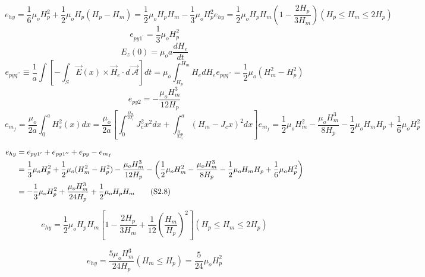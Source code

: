 \begin{equation}%
e_{hy}=\frac{1}{6}\mu_oH_{p}^{2}+\frac{1}{2}\mu_oH_p(H_p-H_m) 
=\frac{1}{2}\mu_oH_pH_m-\frac{1}{3}\mu_oH_{p}^{2}
e_{hy}=\frac{1}{2}\mu_oH_pH_m\left(1-\frac{2H_p}{3H_m}\right)       (H_p\leq H_m\leq 2H_p)
\end{equation}
\begin{equation}%
e_{py1^\prime}=\frac{1}{3}\mu_oH_{p}^{2}
\end{equation}
\begin{equation}%
E_z(0)=\mu_oa\frac{dH_e}{dt}
\end{equation}
\begin{equation}%
e_{pyq^{\prime\prime}}\equiv\frac{1}{a}\int\left[-\int_{S}\vec{E}(x)\times\vec{H}_e\cdot d\vec{\ \mathcal{A}}\right]dt=\mu_o\int_{H_p}^{H_m}H_edH_e
e_{pyq^{\prime\prime}}=\frac{1}{2}\mu_o(H_{m}^{2}-H_{p}^{2})
\end{equation}
\begin{equation}%
e_{py2}=-\frac{\mu_oH_{m}^{3}}{12H_p}
\end{equation}
\begin{equation}%
e_{m_f}=\frac{\mu_o}{2a}\int_{0}^{a}H_{s}^{2}(x)dx=\frac{\mu_o}{2a}\left[\int_{0}^{\frac{H_m}{2J_c}}J_{c}^{2}x^2dx+\int_{\frac{H_m}{2J_c}}^{a}(H_m-J_cx)^2dx\right]
e_{m_f}=\frac{1}{2}\mu_oH_{m}^{2}-\frac{\mu_oH_{m}^{3}}{8H_p}-\frac{1}{2}\mu_oH_mH_p+\frac{1}{6}\mu_oH_{p}^{2}
\end{equation}

\begin{align*}%
e_{hy}&=e_{py1^\prime}+e_{py1^{\prime\prime}}+e_{py}-e_{m_f} \\\notag
&=\frac{1}{3}\mu_oH_{p}^{2}+\frac{1}{2}\mu_o(H_{m}^{2}-H_{p}^{2})-\frac{\mu_oH_{m}^{3}}{12H_p} 
-\left(\frac{1}{2}\mu_oH_{m}^{2}-\frac{\mu_oH_{m}^{3}}{8H_p}-\frac{1}{2}\mu_oH_mH_p+\frac{1}{6}\mu_oH_{p}^{2}\right) \\\notag
&=-\frac{1}{3}\mu_oH_{p}^{2}+\frac{\mu_oH_{m}^{3}}{24H_p}+\frac{1}{2}\mu_oH_pH_m \tag{S2.8}
\end{align*}

\begin{equation}%
e_{hy}=\frac{1}{2}\mu_oH_pH_m\left[1-\frac{2H_p}{3H_m}+\frac{1}{12}\left(\frac{H_m}{H_p}\right)^2\right]     (H_p\leq H_m\leq 2H_p)
\end{equation}

\begin{equation}%
e_{hy}=\frac{5\mu_oH_{m}^{3}}{24H_p}    (H_m\leq H_p) 
=\frac{5}{24}\mu_oH_{p}^{2}
\end{equation}

